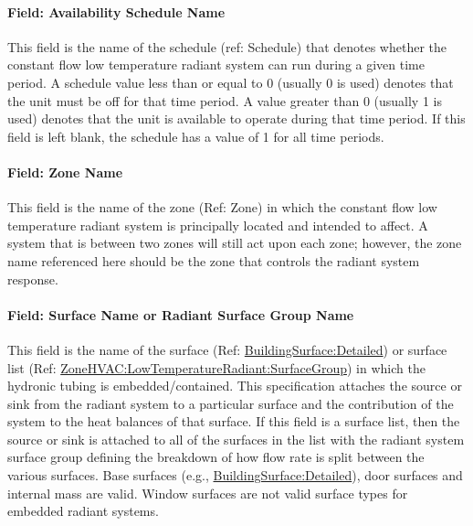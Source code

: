 \paragraph{Field: Availability Schedule Name}\label{field-availability-schedule-name-6-003}

This field is the name of the schedule (ref: Schedule) that denotes whether the constant flow low temperature radiant system can run during a given time period. A schedule value less than or equal to 0 (usually 0 is used) denotes that the unit must be off for that time period. A value greater than 0 (usually 1 is used) denotes that the unit is available to operate during that time period. If this field is left blank, the schedule has a value of 1 for all time periods.

\paragraph{Field: Zone Name}\label{field-zone-name-1-007}

This field is the name of the zone (Ref: Zone) in which the constant flow low temperature radiant system is principally located and intended to affect. A system that is between two zones will still act upon each zone; however, the zone name referenced here should be the zone that controls the radiant system response.

\paragraph{Field: Surface Name or Radiant Surface Group Name}\label{field-surface-name-or-radiant-surface-group-name-1}

This field is the name of the surface (Ref: \hyperref[buildingsurfacedetailed]{BuildingSurface:Detailed}) or surface list (Ref: \hyperref[zonehvaclowtemperatureradiantsurfacegroup]{ZoneHVAC:LowTemperatureRadiant:SurfaceGroup}) in which the hydronic tubing is embedded/contained. This specification attaches the source or sink from the radiant system to a particular surface and the contribution of the system to the heat balances of that surface. If this field is a surface list, then the source or sink is attached to all of the surfaces in the list with the radiant system surface group defining the breakdown of how flow rate is split between the various surfaces. Base surfaces (e.g., \hyperref[buildingsurfacedetailed]{BuildingSurface:Detailed}), door surfaces and internal mass are valid. Window surfaces are not valid surface types for embedded radiant systems.

